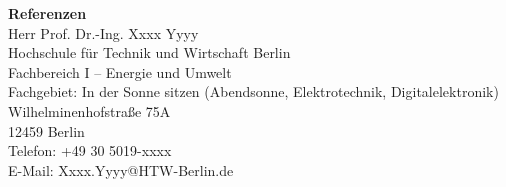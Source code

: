 \newpage


\textbf{Referenzen}\\[0.1cm]
Herr Prof. Dr.-Ing. Xxxx Yyyy\\
Hochschule für Technik und Wirtschaft Berlin\\
Fachbereich I -- Energie und Umwelt\\
Fachgebiet: In der Sonne sitzen (Abendsonne, Elektrotechnik, Digitalelektronik)\\
Wilhelminenhofstraße 75A\\
12459 Berlin\\
Telefon: +49 30 5019-xxxx\\
E-Mail: Xxxx.Yyyy@HTW-Berlin.de\\[0.5cm]
